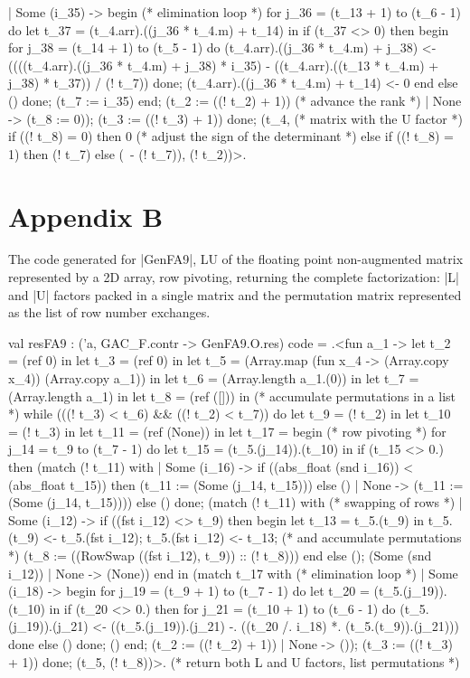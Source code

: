 \documentclass[draft]{elsart}
\begin{document}
\begin{code2}
     | Some (i_35) ->
        begin (* elimination loop *)
         for j_36 = (t_13 + 1) to (t_6 - 1) do
          let t_37 = (t_4.arr).((j_36 * t_4.m) + t_14) in
          if (t_37 <> 0) then begin
           for j_38 = (t_14 + 1) to (t_5 - 1) do
            (t_4.arr).((j_36 * t_4.m) + j_38) <-
             ((((t_4.arr).((j_36 * t_4.m) + j_38) * i_35) -
                ((t_4.arr).((t_13 * t_4.m) + j_38) * t_37)) / (! t_7))
           done;
           (t_4.arr).((j_36 * t_4.m) + t_14) <- 0
          end else ()
         done;
         (t_7 := i_35)
        end;
        (t_2 := ((! t_2) + 1)) (* advance the rank *)
     | None -> (t_8 := 0));
    (t_3 := ((! t_3) + 1))
   done;
   (t_4, (* matrix with the U factor *)
    if ((! t_8) = 0) then 0 (* adjust the sign of the determinant *)
    else if ((! t_8) = 1) then (! t_7)
    else (~- (! t_7)), (! t_2))>.
\end{code2}
\section{Appendix B}
The code generated for |GenFA9|, LU of the floating point
non-augmented matrix
represented by a 2D array, row pivoting, returning the complete
factorization: |L| and |U|
factors packed in a single matrix and the permutation matrix
represented as the list of row number exchanges.
\begin{code2}
val resFA9 : ('a, GAC_F.contr -> GenFA9.O.res) code =
  .<fun a_1 ->
   let t_2 = (ref 0) in
   let t_3 = (ref 0) in
   let t_5 = (Array.map (fun x_4 -> (Array.copy x_4)) (Array.copy a_1)) in
   let t_6 = (Array.length a_1.(0)) in
   let t_7 = (Array.length a_1) in
   let t_8 = (ref ([])) in  (* accumulate permutations in a list *)
   while (((! t_3) < t_6) && ((! t_2) < t_7)) do
    let t_9 = (! t_2) in
    let t_10 = (! t_3) in
    let t_11 = (ref (None)) in
    let t_17 =
     begin   (* row pivoting *)
      for j_14 = t_9 to (t_7 - 1) do
       let t_15 = (t_5.(j_14)).(t_10) in
       if (t_15 <> 0.) then
        (match (! t_11) with
         | Some (i_16) ->
            if ((abs_float (snd i_16)) < (abs_float t_15)) then
             (t_11 := (Some (j_14, t_15)))
            else ()
         | None -> (t_11 := (Some (j_14, t_15))))
       else ()
      done;
      (match (! t_11) with  (* swapping of rows *)
       | Some (i_12) ->
          if ((fst i_12) <> t_9) then begin
           let t_13 = t_5.(t_9) in
           t_5.(t_9) <- t_5.(fst i_12);
           t_5.(fst i_12) <- t_13;  (* and accumulate permutations *)
           (t_8 := ((RowSwap ((fst i_12), t_9)) :: (! t_8)))
          end else ();
          (Some (snd i_12))
       | None -> (None))
     end in
    (match t_17 with  (* elimination loop *)
     | Some (i_18) ->
        begin
         for j_19 = (t_9 + 1) to (t_7 - 1) do
          let t_20 = (t_5.(j_19)).(t_10) in
          if (t_20 <> 0.) then
           for j_21 = (t_10 + 1) to (t_6 - 1) do
            (t_5.(j_19)).(j_21) <-
             ((t_5.(j_19)).(j_21) -. ((t_20 /. i_18) *. (t_5.(t_9)).(j_21)))
           done
          else ()
         done;
         ()
        end;
        (t_2 := ((! t_2) + 1))
     | None -> ());
    (t_3 := ((! t_3) + 1))
   done;
   (t_5, (! t_8))>. (* return both L and U factors, list permutations *)
\end{code2}
\end{document}
